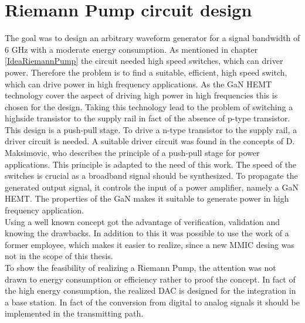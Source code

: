 \chapter{Riemann Pump circuit design}
\label{ch:design}

The goal was to design an arbitrary waveform generator for a signal bandwidth of 6 GHz with a moderate energy consumption.
As mentioned in chapter \ref{IdeaRiemannPump} the circuit needed high speed switches, which can driver power.
Therefore the problem is to find a suitable, efficient, high speed switch, which can drive power in high frequency applications.
As the GaN HEMT technology cover the aspect of driving high power in high frequencies this is chosen for the design.
Taking this technology lead to the problem of switching a highside transistor to the supply rail in fact of the absence of p-type transistor.
This design is a push-pull stage.
To drive a n-type transistor to the supply rail, a driver circuit is needed.
A suitable driver circuit was found in the concepts of D. Maksimovic, who describes the principle of a push-pull stage for power applications.
This principle is adapted to the need of this work.
The speed of the switches is crucial as a broadband signal should be synthesized.
To propagate the generated output signal, it controls the input of a power amplifier, namely a GaN HEMT.
The properties of the GaN makes it suitable to generate power in high frequency application.
\\
Using a well known concept got the advantage of verification, validation and knowing the drawbacks.
In addition to this it was possible to use the work of a former employee, which makes it easier to realize, since a new MMIC desing was not in the scope of this thesis.
\\
To show the feasibility of realizing a Riemann Pump, the attention was not drawn to energy consumption or efficiency rather to proof the concept.
In fact of the high energy consumption, the realized DAC is designed for the integration in a base station.
In fact of the conversion from digital to analog signals it should be implemented in the transmitting path.


